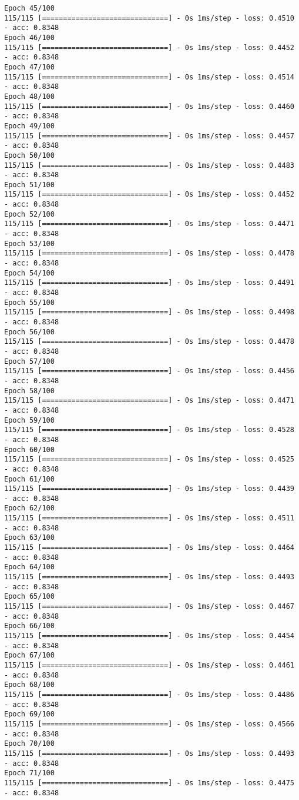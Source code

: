 \documentclass[11pt]{article}
\begin{document}
\begin{Verbatim}[commandchars=\\\{\}]
Epoch 45/100
115/115 [==============================] - 0s 1ms/step - loss: 0.4510 - acc: 0.8348
Epoch 46/100
115/115 [==============================] - 0s 1ms/step - loss: 0.4452 - acc: 0.8348
Epoch 47/100
115/115 [==============================] - 0s 1ms/step - loss: 0.4514 - acc: 0.8348
Epoch 48/100
115/115 [==============================] - 0s 1ms/step - loss: 0.4460 - acc: 0.8348
Epoch 49/100
115/115 [==============================] - 0s 1ms/step - loss: 0.4457 - acc: 0.8348
Epoch 50/100
115/115 [==============================] - 0s 1ms/step - loss: 0.4483 - acc: 0.8348
Epoch 51/100
115/115 [==============================] - 0s 1ms/step - loss: 0.4452 - acc: 0.8348
Epoch 52/100
115/115 [==============================] - 0s 1ms/step - loss: 0.4471 - acc: 0.8348
Epoch 53/100
115/115 [==============================] - 0s 1ms/step - loss: 0.4478 - acc: 0.8348
Epoch 54/100
115/115 [==============================] - 0s 1ms/step - loss: 0.4491 - acc: 0.8348
Epoch 55/100
115/115 [==============================] - 0s 1ms/step - loss: 0.4498 - acc: 0.8348
Epoch 56/100
115/115 [==============================] - 0s 1ms/step - loss: 0.4478 - acc: 0.8348
Epoch 57/100
115/115 [==============================] - 0s 1ms/step - loss: 0.4456 - acc: 0.8348
Epoch 58/100
115/115 [==============================] - 0s 1ms/step - loss: 0.4471 - acc: 0.8348
Epoch 59/100
115/115 [==============================] - 0s 1ms/step - loss: 0.4528 - acc: 0.8348
Epoch 60/100
115/115 [==============================] - 0s 1ms/step - loss: 0.4525 - acc: 0.8348
Epoch 61/100
115/115 [==============================] - 0s 1ms/step - loss: 0.4439 - acc: 0.8348
Epoch 62/100
115/115 [==============================] - 0s 1ms/step - loss: 0.4511 - acc: 0.8348
Epoch 63/100
115/115 [==============================] - 0s 1ms/step - loss: 0.4464 - acc: 0.8348
Epoch 64/100
115/115 [==============================] - 0s 1ms/step - loss: 0.4493 - acc: 0.8348
Epoch 65/100
115/115 [==============================] - 0s 1ms/step - loss: 0.4467 - acc: 0.8348
Epoch 66/100
115/115 [==============================] - 0s 1ms/step - loss: 0.4454 - acc: 0.8348
Epoch 67/100
115/115 [==============================] - 0s 1ms/step - loss: 0.4461 - acc: 0.8348
Epoch 68/100
115/115 [==============================] - 0s 1ms/step - loss: 0.4486 - acc: 0.8348
Epoch 69/100
115/115 [==============================] - 0s 1ms/step - loss: 0.4566 - acc: 0.8348
Epoch 70/100
115/115 [==============================] - 0s 1ms/step - loss: 0.4493 - acc: 0.8348
Epoch 71/100
115/115 [==============================] - 0s 1ms/step - loss: 0.4475 - acc: 0.8348

\end{Verbatim}
\end{document}
